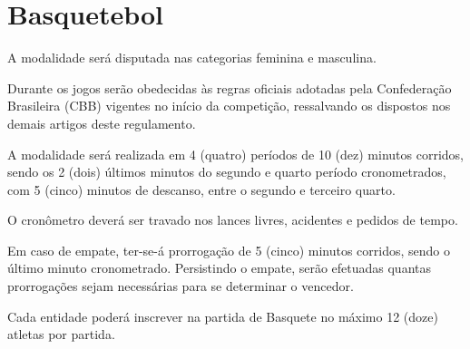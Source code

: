{\let\clearpage\relax \chapter{Basquetebol}}

\begin{article}
	A modalidade será disputada nas categorias feminina e masculina.
\end{article}

\begin{article}
	Durante os jogos serão obedecidas às regras oficiais adotadas pela Confederação Brasileira (CBB) vigentes no início da competição, ressalvando os dispostos nos demais artigos deste regulamento.
\end{article}

\begin{article}
	A modalidade será realizada em 4 (quatro) períodos de 10 (dez) minutos corridos, sendo os 2 (dois) últimos minutos do segundo e quarto período cronometrados, com 5 (cinco) minutos de descanso, entre o segundo e terceiro quarto.

	\begin{xparagraph}
		O cronômetro deverá ser travado nos lances livres, acidentes e pedidos de tempo.
	\end{xparagraph}

	\begin{xparagraph}
		Em caso de empate, ter-se-á prorrogação de 5 (cinco) minutos corridos, sendo o último minuto cronometrado. Persistindo o empate, serão efetuadas quantas prorrogações sejam necessárias para se determinar o vencedor.
	\end{xparagraph}
\end{article}

\begin{article}
	Cada entidade poderá inscrever na partida de Basquete no máximo 12 (doze) atletas por partida.
\end{article}

